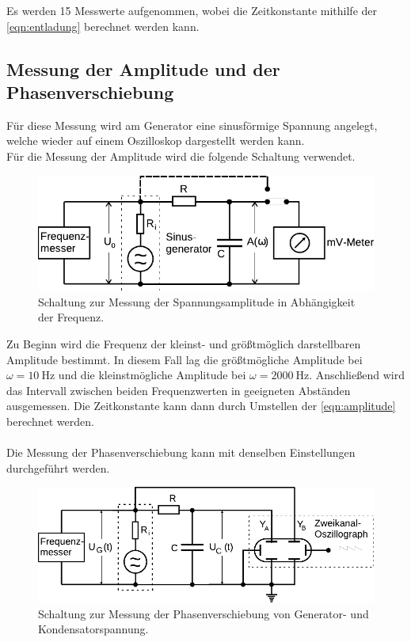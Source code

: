     Es werden 15 Messwerte aufgenommen,
    wobei die Zeitkonstante mithilfe der \autoref{eqn:entladung} berechnet werden kann.

\subsection{Messung der Amplitude und der Phasenverschiebung}

    Für diese Messung wird am Generator eine sinusförmige Spannung angelegt,
    welche wieder auf einem Oszilloskop dargestellt werden kann.\\
    Für die Messung der Amplitude wird die folgende Schaltung verwendet.

    \begin{figure}
        \centering
        \includegraphics{content/img/Abb_5.pdf}
        \caption{Schaltung zur Messung der Spannungsamplitude in Abhängigkeit der Frequenz. \cite{versuchsanleitung}}
        \label{fig:messung_amplitude}
    \end{figure}

    Zu Beginn wird die Frequenz der kleinst- und größtmöglich darstellbaren Amplitude bestimmt.
    In diesem Fall lag die größtmögliche Amplitude bei $\omega = \SI{10}{\hertz}$
    und die kleinstmögliche Amplitude bei $\omega = \SI{2000}{\hertz}$.
    Anschließend wird das Intervall zwischen beiden Frequenzwerten in geeigneten Abständen ausgemessen.
    Die Zeitkonstante kann dann durch Umstellen der \autoref{eqn:amplitude} berechnet werden.\\
    \\
    Die Messung der Phasenverschiebung kann mit denselben Einstellungen durchgeführt werden.

    \begin{figure}
        \centering
        \includegraphics{content/img/Abb_6.pdf}
        \caption{Schaltung zur Messung der Phasenverschiebung von Generator- und Kondensatorspannung. \cite{versuchsanleitung}}
        \label{fig:messung_phasenverschiebung}
    \end{figure}

